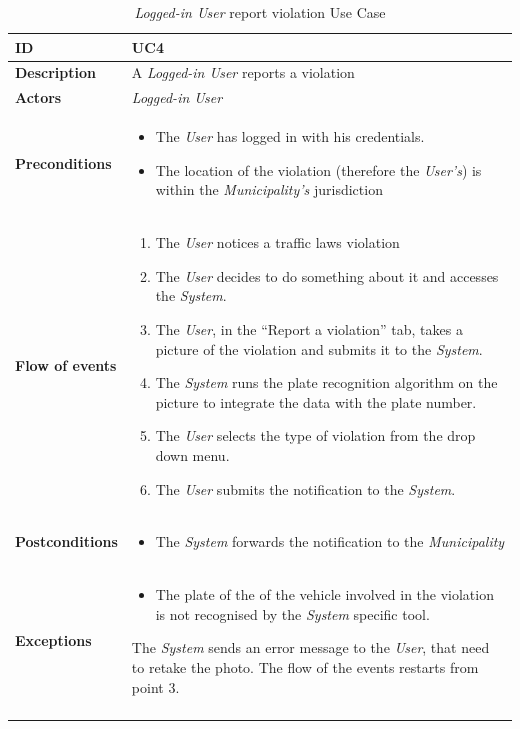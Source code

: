 \documentclass {article}
\begin{document}
	\pagebreak
	\begin{longtable}{| p{3 cm} | p{10.5 cm} |} 
			\hline
			{\bf ID} & UC4 \\
			\hline
			{\bf Description} & A {\it Logged-in User} reports a violation \\
			\hline
			{\bf Actors} & {\it Logged-in User}\\
			\hline
			{\bf Preconditions} & \begin{itemize}
								  \item The {\it User} has logged in with his credentials.
								  \item The location of the violation (therefore the {\it User's}) is within the {\it Municipality's} jurisdiction
								  \end{itemize}	\\
			\hline
			{\bf Flow of events} &	\begin{enumerate}
								  \item The {\it User} notices a traffic laws violation 
								  \item The {\it User} decides to do something about it and accesses the {\it System}.
								  \item The {\it User}, in the “Report a violation” tab, takes a picture of the violation and submits it to the {\it System}.
								  \item The {\it System} runs the plate recognition algorithm on the picture to integrate the data with the plate number.
								  \item The {\it User} selects the type of violation from the drop down menu.
								  \item The {\it User} submits the notification to the {\it System}.
								  \end{enumerate}	\\
			\hline
			{\bf Postconditions} & \begin{itemize}
								  \item The {\it System} forwards the notification to the {\it Municipality}
								  \end{itemize}	 \\
			\hline
			{\bf Exceptions} & 	\begin{itemize}
								  \item The plate of the of the vehicle involved in the violation is not recognised by the {\it System} specific tool. 
								  \end{itemize}
								  The {\it System} sends an error message to the {\it User}, that need to retake the photo. The flow of the events restarts from point 3. \\
			\hline
			\caption{{\it Logged-in User} report violation Use Case}
			\end{longtable}
\end{document}
